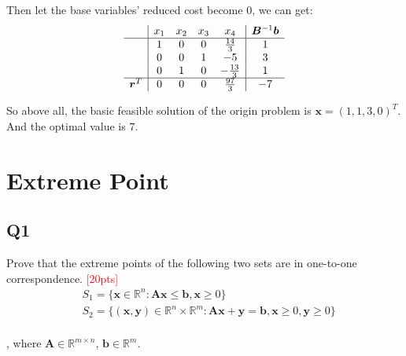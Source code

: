 \documentclass[10pt]{article}
\renewcommand{\mathbf}{\boldsymbol}
\begin{document}
Then let the base variables' reduced cost become $0$, we can get:\\
\begin{equation}
	\begin{aligned}
		\begin{array}{c|cccc|c}
			& x_1 & x_2 & x_3 & x_4 & \mathbf{B}^{-1}\mathbf{b} \\
			\hline
			& 1 & 0 & 0 & \frac{14}{3} & 1 \\
			& 0 & 0 & 1 & -5 & 3 \\
			& 0 & 1 & 0 & -\frac{13}{3} & 1 \\
			\hline
			\mathbf{r}^T & 0 & 0 & 0 & \frac{97}{3} & -7 \\
		\end{array}
	\end{aligned}
\end{equation}

So above all, the basic feasible solution of the origin problem is $\mathbf{x}=(1,1,3,0)^T$.\\
And the optimal value is $7$.\\

\newpage

\section{Extreme Point}
\subsection{Q1}
Prove that the extreme points of the following two sets are in one-to-one correspondence.
\textcolor{red}{[20pts]}
\begin{equation}
	\begin{aligned}
		& S_{1} = \{ \bm{x} \in \mathbb{R}^{n} : \bm{Ax} \leq \bm{b}, \bm{x} \geq 0 \} \\
		& S_{2} = \{ \bm{(x, y)} \in \mathbb{R}^{n} \times \mathbb{R}^{m} : \bm{Ax} + \bm{y} = \bm{b}, \bm{x} \geq 0, \bm{y} \geq 0 \} \\
	\end{aligned}
\end{equation}
 
, where $\bm{A} \in \mathbb{R}^{m \times n}$, $\bm{b} \in \mathbb{R}^{m}$.\\
\end{document}
